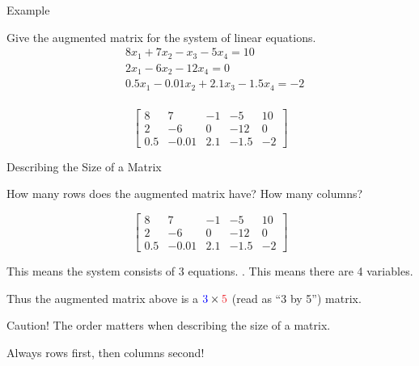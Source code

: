 \documentclass[xcolor=dvipsnames,aspectratio=169,t]{beamer}
\begin{document}
\begin{frame}{Example}

  \begin{example}
  Give the augmented matrix for the system of linear equations.
    \begin{align*}
      & 8x_1+7x_2-x_3 - 5x_4 = 10 \\
      & 2x_1-6x_2- 12x_4 = 0 \\
      & 0.5x_1-0.01x_2+2.1x_3 - 1.5x_4 = -2 \\
    \end{align*}
  \end{example}

  \pause
  \begin{solution}
    \[ \begin{bmatrix}
      8 & 7 & -1 & -5 & 10 \\
      2 & -6 & 0 & -12 & 0 \\
      0.5 & -0.01 & 2.1 & -1.5 & -2
    \end{bmatrix} \]
  \end{solution}
  
\end{frame}

\begin{frame}{Describing the Size of a Matrix}

  How many rows does the augmented matrix have? How many columns?
  
\[ \begin{bmatrix}
      8 & 7 & -1 & -5 & 10 \\
      2 & -6 & 0 & -12 & 0 \\
      0.5 & -0.01 & 2.1 & -1.5 & -2
    \end{bmatrix} \]

  \bi
  \ii {} This means the system consists of 3 equations.
  \ii {}. This means there are 4 variables.
  \ei
  \bigskip

  Thus the augmented matrix above is a $\colorb{3} \times \colorr{5}$ (read as ``3 by 5'') matrix.

  \vspace*{1em}

  \pause
  \bbox
  \alert{Caution!} The order matters when describing the size of a matrix. 
  
  \phantom{Caution!} Always \alert{rows first}, then columns second!
  \ebox

\end{frame}
\end{document}
